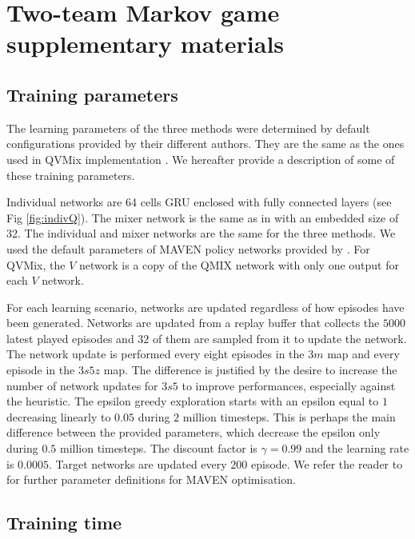 \chapter{Two-team Markov game supplementary materials} \label{ch:ch7_appendix}
\section{Training parameters}
\label{app:train_param}
The learning parameters of the three methods were determined by default configurations provided by their different authors.
They are the same as the ones used in QVMix implementation \citep{leroy2020qvmix}.
We hereafter provide a description of some of these training parameters.

Individual networks are 64 cells GRU enclosed with fully connected layers (see Fig \ref{fig:indivQ}).
The mixer network is the same as in \citep{Rashid2018} with an embedded size of 32.
The individual and mixer networks are the same for the three methods.
We used the default parameters of MAVEN policy networks provided by \citep{Mahajan2019MAVEN:Exploration}.
For QVMix, the $V$ network is a copy of the QMIX network with only one output for each $V$ network.

For each learning scenario, networks are updated regardless of how episodes have been generated.
Networks are updated from a replay buffer that collects the $5000$ latest played episodes and $32$ of them are sampled from it to update the network.
The network update is performed every eight episodes in the $3m$ map and every episode in the $3s5z$ map.
The difference is justified by the desire to increase the number of network updates for $3s5$ to improve performances, especially against the heuristic.
The epsilon greedy exploration starts with an epsilon equal to $1$ decreasing linearly to $0.05$ during $2$ million timesteps.
This is perhaps the main difference between the provided parameters, which decrease the epsilon only during $0.5$ million timesteps.
The discount factor is $\gamma = 0.99$ and the learning rate is $0.0005$.
Target networks are updated every $200$ episode.
We refer the reader to \citep{Mahajan2019MAVEN:Exploration} for further parameter definitions for MAVEN optimisation.

\section{Training time}
\label{app:train_time}


